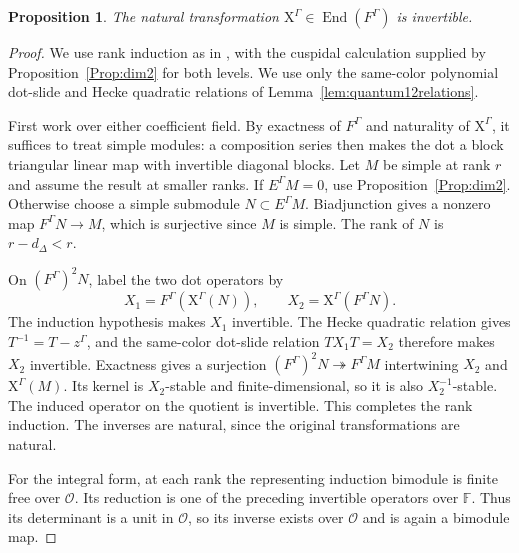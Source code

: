 \documentclass[12pt]{amsart}
\numberwithin{itemcounter}{subsection}
\theoremstyle{plain}
\newtheorem{proposition}[theorem]{Proposition}
\theoremstyle{definition}
\theoremstyle{remark}
\numberwithin{equation}{section}
\def\bbF{\mathbb{F}}
\def\calO{\mathcal{O}}
\def\End{\operatorname{End}\nolimits}
\def\End{{\operatorname{End}}}
\begin{document}
\begin{proposition}\label{prop:invertible}
The natural transformation
$\mathrm{X}^\Gamma\in \End(F^\Gamma)$ is invertible.
\end{proposition}
\begin{proof}
We use rank induction as in \cite[Proposition~2.18]{LSZ25}, with the
cuspidal calculation supplied by Proposition~\ref{Prop:dim2} for both
levels.  We use only the same-color polynomial dot-slide and
Hecke quadratic relations of Lemma~\ref{lem:quantum12relations}.

First work over either coefficient field.  By exactness of $F^\Gamma$ and
naturality of $\mathrm X^\Gamma$, it suffices to treat simple modules:
a composition series then makes the dot a block triangular linear map
with invertible diagonal blocks.  Let $M$ be simple at rank $r$ and
assume the result at smaller ranks.  If $E^\Gamma M=0$, use
Proposition~\ref{Prop:dim2}.  Otherwise choose a simple submodule
$N\subset E^\Gamma M$.  Biadjunction gives a nonzero map
$F^\Gamma N\longrightarrow M$, which is surjective since $M$ is simple.
The rank of $N$ is $r-d_\Delta<r$.

On $(F^\Gamma)^2N$, label the two dot operators by
\[
 X_1=F^\Gamma(\mathrm X^\Gamma(N)),\qquad
 X_2=\mathrm X^\Gamma(F^\Gamma N).
\]
The induction hypothesis makes $X_1$ invertible.  The Hecke quadratic
relation gives $T^{-1}=T-z^\Gamma$, and the same-color dot-slide relation
$TX_1T=X_2$ therefore makes $X_2$ invertible.  Exactness gives a surjection
$(F^\Gamma)^2N\twoheadrightarrow F^\Gamma M$ intertwining $X_2$ and
$\mathrm X^\Gamma(M)$.  Its kernel is $X_2$-stable and finite-dimensional,
so it is also $X_2^{-1}$-stable.  The induced operator on the quotient is
invertible.  This completes the rank induction.  The inverses are natural,
since the original transformations are natural.

For the integral form, at each rank the representing induction bimodule
is finite free over $\calO$.  Its reduction is one of the preceding
invertible operators over $\bbF$.  Thus its determinant is a unit in
$\calO$, so its inverse exists over $\calO$ and is again a bimodule map.
\end{proof}
\end{document}

